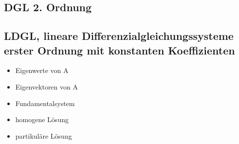 \subsection{DGL 2. Ordnung}


\subsection{LDGL, lineare Differenzialgleichungssysteme erster Ordnung mit konstanten Koeffizienten}




\begin{itemize}
    \item Eigenwerte von A
    \item Eigenvektoren von A
    \item Fundamentalsystem
    \item homogene Lösung
    \item partikuläre Lösung
\end{itemize}


